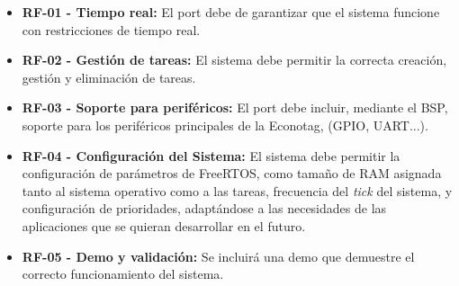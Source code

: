 %
%
%
%

\begin{itemize}
    \item \textbf{RF-01 - Tiempo real:} El port debe de garantizar que el sistema funcione con restricciones de tiempo real.
    \item \textbf{RF-02 - Gestión de tareas:} El sistema debe permitir la correcta creación, gestión y eliminación de tareas.
    \item \textbf{RF-03 - Soporte para periféricos:} El port debe incluir, mediante el BSP, soporte para los periféricos principales de la Econotag, (GPIO, UART...).
    \item \textbf{RF-04 - Configuración del Sistema:} El sistema debe permitir la configuración de parámetros de FreeRTOS, como tamaño de RAM asignada tanto al sistema operativo como a las tareas, frecuencia del \emph{tick} del sistema, y configuración de prioridades, adaptándose a las necesidades de las aplicaciones que se quieran desarrollar en el futuro.
    \item \textbf{RF-05 - Demo y validación:} Se incluirá una demo que demuestre el correcto funcionamiento del sistema.
\end{itemize}
